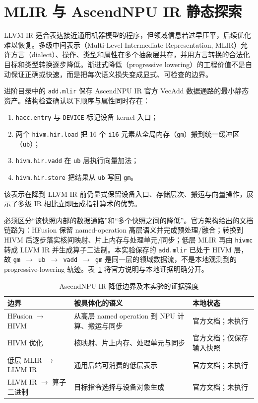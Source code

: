 \section{MLIR 与 AscendNPU IR 静态探索}
\label{sec:mlir}

LLVM IR 适合表达接近通用机器模型的程序，但领域信息若过早压平，后续优化难以恢复。多级中间表示（Multi-Level Intermediate Representation, MLIR）允许方言（dialect）、操作、类型和属性在多个抽象层共存，并用方言转换的合法化目标和类型转换逐步降低\cite{lattner2021mlir,mlirDialectConversion}。渐进式降低（progressive lowering）的工程价值不是自动保证正确或快速，而是把每次语义损失变成显式、可检查的边界。

进阶目录中的 \texttt{add.mlir} 保存 AscendNPU IR 官方 VecAdd 数据通路的最小静态资产\cite{ascendVecAdd}。结构检查确认以下顺序与属性同时存在：
\begin{enumerate}
  \item \texttt{hacc.entry} 与 \texttt{DEVICE} 标记设备 kernel 入口；
  \item 两个 \texttt{hivm.hir.load} 把 16 个 \texttt{i16} 元素从全局内存（\texttt{gm}）搬到统一缓冲区（\texttt{ub}）；
  \item \texttt{hivm.hir.vadd} 在 \texttt{ub} 层执行向量加法；
  \item \texttt{hivm.hir.store} 把结果从 \texttt{ub} 写回 \texttt{gm}。
\end{enumerate}
该表示在降到 LLVM IR 前仍显式保留设备入口、存储层次、搬运与向量操作，展示了多级 IR 相比立即压成指针算术的优势。

必须区分“该快照内部的数据通路”和“多个快照之间的降低”。官方架构给出的文档链路为：HFusion 保留 named-operation 高层语义并完成预处理/融合；转换到 HIVM 后逐步落实核间映射、片上内存与处理单元/同步；低层 MLIR 再由 \texttt{hivmc} 转成 LLVM IR 并生成算子二进制\cite{ascendArchitecture}。本实验保存的 \texttt{add.mlir} 已处于 HIVM 层，故 \texttt{gm $\rightarrow$ ub $\rightarrow$ vadd $\rightarrow$ gm} 是同一层的领域数据流，不是本地观测到的 progressive-lowering 轨迹。表~\ref{tab:ascend-lowering} 将官方说明与本地证据明确分开。

\begin{table}
\caption{AscendNPU IR 降低边界及本实验的证据强度}
\label{tab:ascend-lowering}
\centering
\begin{tabularx}{\textwidth}{lXX}
\toprule
边界 & 被具体化的语义 & 本地状态 \\
\midrule
HFusion $\rightarrow$ HIVM & 从高层 named operation 到 NPU 计算、搬运与同步 & 官方文档；未执行 \\
HIVM 优化 & 核映射、片上内存、处理单元与同步 & 官方文档；仅保存输入快照 \\
低层 MLIR $\rightarrow$ LLVM IR & 通用后端可消费的低层表示 & 官方文档；未执行 \\
LLVM IR $\rightarrow$ 算子二进制 & 目标指令选择与设备对象生成 & 官方文档；未执行 \\
\bottomrule
\end{tabularx}
\end{table}

